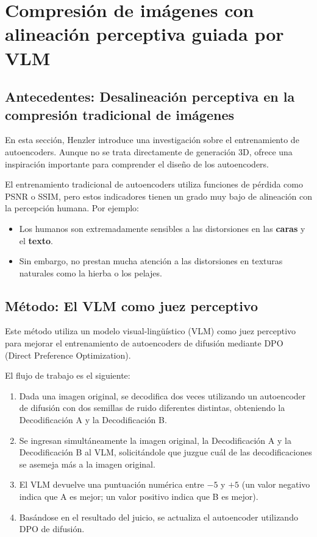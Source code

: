 \section{Compresión de imágenes con alineación perceptiva guiada por VLM}

\subsection{Antecedentes: Desalineación perceptiva en la compresión tradicional de imágenes}

En esta sección, Henzler introduce una investigación sobre el entrenamiento de autoencoders. Aunque no se trata directamente de generación 3D, ofrece una inspiración importante para comprender el diseño de los autoencoders.

El entrenamiento tradicional de autoencoders utiliza funciones de pérdida como PSNR o SSIM, pero estos indicadores tienen un grado muy bajo de alineación con la percepción humana. Por ejemplo:

\begin{itemize}
    \item Los humanos son extremadamente sensibles a las distorsiones en las \textbf{caras} y el \textbf{texto}.
    \item Sin embargo, no prestan mucha atención a las distorsiones en texturas naturales como la hierba o los pelajes.
\end{itemize}

\subsection{Método: El VLM como juez perceptivo}

Este método utiliza un modelo visual-lingüístico (VLM) como juez perceptivo para mejorar el entrenamiento de autoencoders de difusión mediante DPO (Direct Preference Optimization).

El flujo de trabajo es el siguiente:

\begin{enumerate}
    \item Dada una imagen original, se decodifica dos veces utilizando un autoencoder de difusión con dos semillas de ruido diferentes distintas, obteniendo la Decodificación A y la Decodificación B.
    \item Se ingresan simultáneamente la imagen original, la Decodificación A y la Decodificación B al VLM, solicitándole que juzgue cuál de las decodificaciones se asemeja más a la imagen original.
    \item El VLM devuelve una puntuación numérica entre $-5$ y $+5$ (un valor negativo indica que A es mejor; un valor positivo indica que B es mejor).
    \item Basándose en el resultado del juicio, se actualiza el autoencoder utilizando DPO de difusión.
\end{enumerate}

